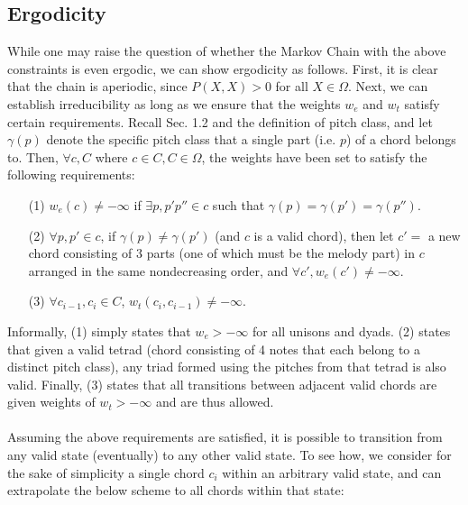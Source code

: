 \documentclass[twoside]{article}
\begin{document}
	\subsection{Ergodicity}
	While one may raise the question of whether the Markov Chain with the above constraints is even ergodic, we can show ergodicity as follows. First, it is clear that the chain is aperiodic, since $P(X, X) > 0$ for all $X \in \Omega$.	Next, we can establish irreducibility as long as we ensure that the weights $w_e$ and $w_t$ satisfy certain requirements. Recall Sec. 1.2 and the definition of pitch class, and let $\gamma(p)$ denote the specific pitch class that a single part (i.e. $p$) of a chord belongs to. Then, $\forall c,C$ where $c \in C, C \in \Omega$, the weights have been set to satisfy the following requirements:
	\begin{enumerate}
		\item [(1)]
		$w_e(c) \neq -\infty$ if $\exists p, p' p'' \in c$ such that $\gamma(p) = \gamma(p') = \gamma(p'')$.
		\item [(2)]
		$\forall p, p' \in c$, if $\gamma(p) \neq \gamma(p')$ (and $c$ is a valid chord), then let $c' = $ a new chord consisting of 3 parts (one of which must be the melody part) in $c$ arranged in the same nondecreasing order, and $\forall c', w_e(c') \neq -\infty$.
		\item[(3)]
		$\forall c_{i-1},c_i \in C$, $w_t(c_i, c_{i-1}) \neq -\infty$.
	\end{enumerate}
	Informally, (1) simply states that $w_e > -\infty$ for all unisons and dyads. (2) states that given a valid tetrad (chord consisting of 4 notes that each belong to a distinct pitch class), any triad formed using the pitches from that tetrad is also valid. Finally, (3) states that all transitions between adjacent valid chords are given weights of $w_t > -\infty$ and are thus allowed.
	\\\\
	Assuming the above requirements are satisfied, it is possible to transition from any valid state (eventually) to any other valid state. To see how, we consider for the sake of simplicity a single chord $c_i$ within an arbitrary valid state, and can extrapolate the below scheme to all chords within that state:
\end{document}
